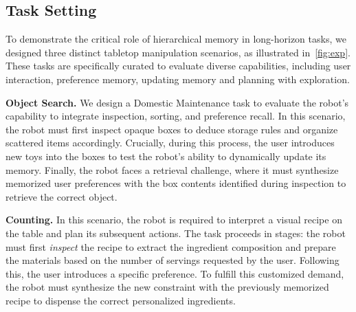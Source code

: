 
\subsection{Task Setting}



To demonstrate the critical role of hierarchical memory in long-horizon tasks, we designed three distinct tabletop manipulation scenarios, as illustrated in~\autoref{fig:exp}. These tasks are specifically curated to evaluate diverse capabilities, including user interaction, preference memory, updating memory and planning with exploration.

\textbf{Object Search.} 
We design a Domestic Maintenance task to evaluate the robot's capability to integrate inspection, sorting, and preference recall. In this scenario, the robot must first inspect opaque boxes to deduce storage rules and organize scattered items accordingly. Crucially, during this process, the user introduces new toys into the boxes to test the robot's ability to dynamically update its memory. Finally, the robot faces a retrieval challenge, where it must synthesize memorized user preferences with the box contents identified during inspection to retrieve the correct object.

\textbf{Counting.} 
In this scenario, the robot is required to interpret a visual recipe on the table and plan its subsequent actions. The task proceeds in stages: the robot must first \textit{inspect} the recipe to extract the ingredient composition and prepare the materials based on the number of servings requested by the user. Following this, the user introduces a specific preference. To fulfill this customized demand, the robot must synthesize the new constraint with the previously memorized recipe to dispense the correct personalized ingredients.

